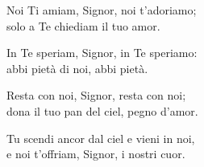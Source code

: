 
\strofa Noi Ti amiam, Signor, noi t'adoriamo;\\
solo a Te chiediam il tuo amor.

\spazio


\spazio

\strofa In Te speriam, Signor, in Te speriamo:\\
abbi pietà di noi, abbi pietà.

\spazio


\spazio

\strofa Resta con noi, Signor, resta con noi;\\
dona il tuo pan del ciel, pegno d'amor.

\spazio


\spazio

\strofa Tu scendi ancor dal ciel e vieni in noi,\\
e noi t'offriam, Signor, i nostri cuor.

\spazio

